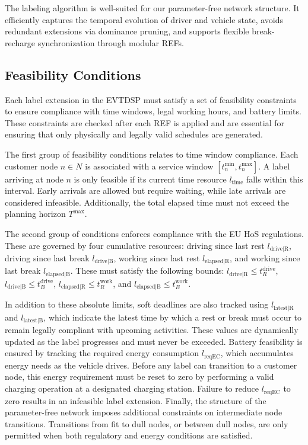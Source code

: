 \documentclass[trsc,dblanonrev]{informs4}
\begin{document}
The labeling algorithm is well-suited for our parameter-free network structure. It efficiently captures the temporal evolution of driver and vehicle state, avoids redundant extensions via dominance pruning, and supports flexible break-recharge synchronization through modular REFs.

\subsection{Feasibility Conditions}\label{sec:FeasibilityConditions}

Each label extension in the EVTDSP must satisfy a set of feasibility constraints to ensure compliance with time windows, legal working hours, and battery limits. These constraints are checked after each REF is applied and are essential for ensuring that only physically and legally valid schedules are generated.

The first group of feasibility conditions relates to time window compliance. Each customer node \( n \in N \) is associated with a service window \( [t^{\min}_n, t^{\max}_n] \). A label arriving at node \( n \) is only feasible if its current time resource \( l_{\text{time}} \) falls within this interval. Early arrivals are allowed but require waiting, while late arrivals are considered infeasible. Additionally, the total elapsed time must not exceed the planning horizon \( T^{\text{max}} \).

The second group of conditions enforces compliance with the EU HoS regulations. These are governed by four cumulative resources: driving since last rest \( l_{\text{drive|R}} \), driving since last break \( l_{\text{drive|B}} \), working since last rest \( l_{\text{elapsed|R}} \), and working since last break \( l_{\text{elapsed|B}} \). These must satisfy the following bounds: \( l_{\text{drive|R}} \leq t^{\text{drive}}_R \), \( l_{\text{drive|B}} \leq t^{\text{drive}}_B \), \( l_{\text{elapsed|R}} \leq t^{\text{work}}_R \), and \( l_{\text{elapsed|B}} \leq t^{\text{work}}_B \).

In addition to these absolute limits, soft deadlines are also tracked using \( l_{\text{latest|R}} \) and \( l_{\text{latest|B}} \), which indicate the latest time by which a rest or break must occur to remain legally compliant with upcoming activities. These values are dynamically updated as the label progresses and must never be exceeded. Battery feasibility is ensured by tracking the required energy consumption \( l_{\text{reqEC}} \), which accumulates energy needs as the vehicle drives. Before any label can transition to a customer node, this energy requirement must be reset to zero by performing a valid charging operation at a designated charging station. Failure to reduce \( l_{\text{reqEC}} \) to zero results in an infeasible label extension. Finally, the structure of the parameter-free network imposes additional constraints on intermediate node transitions. Transitions from fit to dull nodes, or between dull nodes, are only permitted when both regulatory and energy conditions are satisfied.
\end{document}
